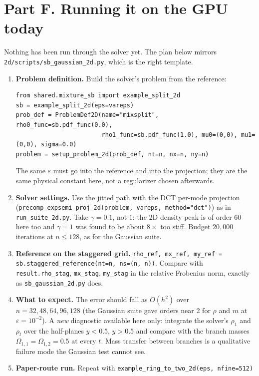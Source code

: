 \documentclass[11pt]{article}
\newcommand{\eps}{\varepsilon}
\newcommand{\code}[1]{\texttt{#1}}
\newcounter{ex}
\begin{document}
\section*{Part F. Running it on the GPU today}

Nothing has been run through the solver yet. The plan below mirrors
\code{2d/scripts/sb\_gaussian\_2d.py}, which is the right template.

\begin{enumerate}
  \item \textbf{Problem definition.} Build the solver's problem from the reference:
\begin{lstlisting}
from shared.mixture_sb import example_split_2d
sb = example_split_2d(eps=vareps)
prob_def = ProblemDef2D(name="mixsplit", rho0_func=sb.pdf_func(0.0),
                        rho1_func=sb.pdf_func(1.0), mu0=(0,0), mu1=(0,0), sigma=0.0)
problem = setup_problem_2d(prob_def, nt=n, nx=n, ny=n)
\end{lstlisting}
        The same $\eps$ must go into the reference and into the projection; they are the same
        physical constant here, not a regularizer chosen afterwards.
  \item \textbf{Solver settings.} Use the jitted path with the DCT per-mode projection
        (\code{precomp\_expsemi\_proj\_2d(problem, vareps, method="dct")}) as in
        \code{run\_suite\_2d.py}. Take $\gamma=0.1$, not $1$: the 2D density peak is of order
        $60$ here too and $\gamma=1$ was found to be about $8\times$ too stiff. Budget
        $20{,}000$ iterations at $n\le128$, as for the Gaussian suite.
  \item \textbf{Reference on the staggered grid.} \code{rho\_ref, mx\_ref, my\_ref =
        sb.staggered\_reference(nt=n, ns=(n, n))}. Compare with \code{result.rho\_stag},
        \code{mx\_stag}, \code{my\_stag} in the relative Frobenius norm, exactly as
        \code{sb\_gaussian\_2d.py} does.
  \item \textbf{What to expect.} The error should fall as $O(h^2)$ over $n=32,48,64,96,128$
        (the Gaussian suite gave orders near 2 for $\rho$ and $m$ at $\eps=10^{-2}$). A
        \emph{new} diagnostic available here only: integrate the solver's $\rho_1$ and
        $\rho_t$ over the half-planes $y<0.5$, $y>0.5$ and compare with the branch masses
        $\Omega_{1,1}=\Omega_{1,2}=0.5$ at every $t$. Mass transfer between branches is a
        qualitative failure mode the Gaussian test cannot see.
  \item \textbf{Paper-route run.} Repeat with \code{example\_ring\_to\_two\_2d(eps, nfine=512)}

\end{enumerate}
\end{document}
